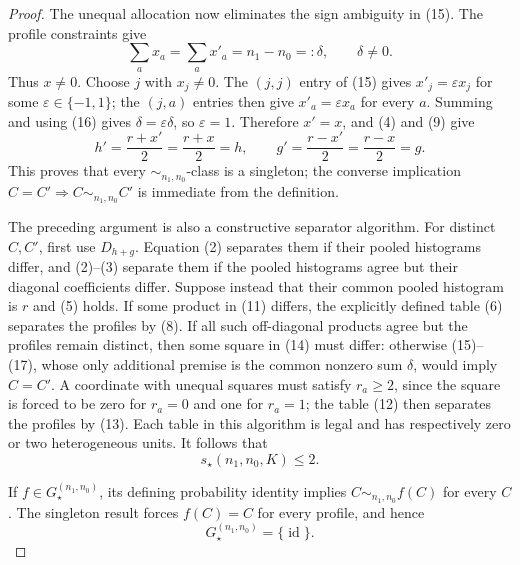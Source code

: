 \documentclass{article}
\begin{document}
\begin{proof}
The unequal allocation now eliminates the sign ambiguity in (15).  The profile constraints give
\[
 \sum_a x_a=\sum_a x'_a=n_1-n_0=:\delta,
 \qquad \delta\neq0.
 \tag{16}
\]
Thus \(x\neq0\).  Choose \(j\) with \(x_j\neq0\).  The \((j,j)\) entry of (15) gives \(x'_j=\varepsilon x_j\) for some \(\varepsilon\in\{-1,1\}\); the \((j,a)\) entries then give \(x'_a=\varepsilon x_a\) for every \(a\).  Summing and using (16) gives \(\delta=\varepsilon\delta\), so \(\varepsilon=1\).  Therefore \(x'=x\), and (4) and (9) give
\[
 h'=\frac{r+x'}2=\frac{r+x}2=h,
 \qquad
 g'=\frac{r-x'}2=\frac{r-x}2=g.
 \tag{17}
\]
This proves that every \(\sim_{n_1,n_0}\)-class is a singleton; the converse implication \(C=C'\Rightarrow C\sim_{n_1,n_0}C'\) is immediate from the definition.

The preceding argument is also a constructive separator algorithm.  For distinct \(C,C'\), first use \(D_{h+g}\).  Equation (2) separates them if their pooled histograms differ, and (2)--(3) separate them if the pooled histograms agree but their diagonal coefficients differ.  Suppose instead that their common pooled histogram is \(r\) and (5) holds.  If some product in (11) differs, the explicitly defined table (6) separates the profiles by (8).  If all such off-diagonal products agree but the profiles remain distinct, then some square in (14) must differ: otherwise (15)--(17), whose only additional premise is the common nonzero sum \(\delta\), would imply \(C=C'\).  A coordinate with unequal squares must satisfy \(r_a\geq2\), since the square is forced to be zero for \(r_a=0\) and one for \(r_a=1\); the table (12) then separates the profiles by (13).  Each table in this algorithm is legal and has respectively zero or two heterogeneous units.  It follows that
\[
 s_\star(n_1,n_0,K)\leq2.
 \tag{18}
\]

If \(f\in G_\star^{(n_1,n_0)}\), its defining probability identity implies \(C\sim_{n_1,n_0}f(C)\) for every \(C\).  The singleton result forces \(f(C)=C\) for every profile, and hence
\[
 G_\star^{(n_1,n_0)}=\{\operatorname{id}\}.
 \tag{19}
\]


\end{proof}
\end{document}
